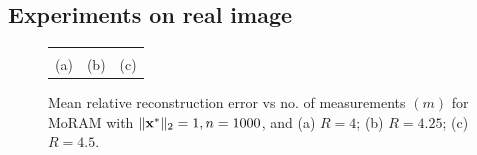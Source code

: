 \subsection{Experiments on real image}
\begin{figure}[!t]
	\begin{center}
		\begin{tabular}{ccc}
			
			&
			
			&
			 \\
			(a) & (b) & (c) \\
		\end{tabular}
	\end{center}
	\caption{{Mean relative reconstruction error vs no. of measurements $(m)$ for MoRAM with $\|\mathbf{x^*}\|_2=1,n=1000$, and (a) $R=4$; (b) $R=4.25$; (c) $R=4.5$.}}
	\label{fig:plot}
\end{figure}


